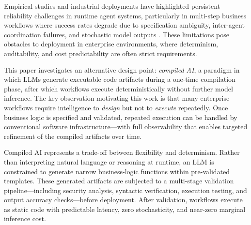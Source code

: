 \documentclass[11pt]{article}
\begin{document}
Empirical studies and industrial deployments have highlighted persistent reliability challenges in runtime agent systems, particularly in multi-step business workflows where success rates degrade due to specification ambiguity, inter-agent coordination failures, and stochastic model outputs \citep{cemri2025multiagent, atil2024nondeterminism}. These limitations pose obstacles to deployment in enterprise environments, where determinism, auditability, and cost predictability are often strict requirements.

This paper investigates an alternative design point: \emph{compiled AI}, a paradigm in which LLMs generate executable code artifacts during a one-time compilation phase, after which workflows execute deterministically without further model inference. The key observation motivating this work is that many enterprise workflows require intelligence to \emph{design} but not to \emph{execute} repeatedly. Once business logic is specified and validated, repeated execution can be handled by conventional software infrastructure---with full observability that enables targeted refinement of the compiled artifacts over time.

Compiled AI represents a trade-off between flexibility and determinism. Rather than interpreting natural language or reasoning at runtime, an LLM is constrained to generate narrow business-logic functions within pre-validated templates. These generated artifacts are subjected to a multi-stage validation pipeline---including security analysis, syntactic verification, execution testing, and output accuracy checks---before deployment. After validation, workflows execute as static code with predictable latency, zero stochasticity, and near-zero marginal inference cost.
\end{document}
